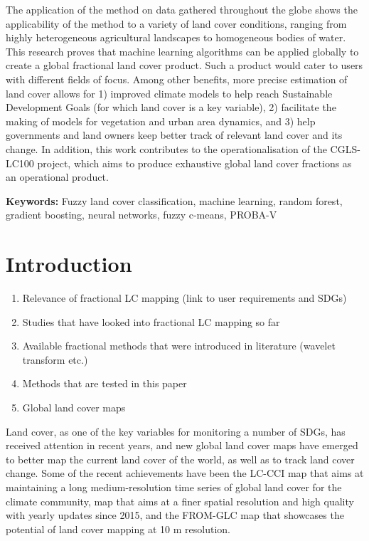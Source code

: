 \documentclass[a4paper,10pt]{article}
\newcommand{\minisection}[1]{\medskip \textbf{#1:}}
\begin{document}
{The application of the method on data gathered throughout the globe shows the applicability of the method to a variety of land cover conditions, ranging from highly heterogeneous agricultural landscapes to homogeneous bodies of water. This research proves that machine learning algorithms can be applied globally to create a global fractional land cover product. Such a product would cater to users with different fields of focus. Among other benefits, more precise estimation of land cover allows for 1) improved climate models to help reach Sustainable Development Goals (for which land cover is a key variable), 2) facilitate the making of models for vegetation and urban area dynamics, and 3) help governments and land owners keep better track of relevant land cover and its change. In addition, this work contributes to the operationalisation of the CGLS-LC100 project, which aims to produce exhaustive global land cover fractions as an operational product.

\minisection{Keywords} Fuzzy land cover classification, machine learning, random forest, gradient boosting, neural networks, fuzzy c-means, PROBA-V
}

\pagebreak
\tableofcontents
\pagebreak

\section{Introduction}

\begin{enumerate}
 \item Relevance of fractional LC mapping (link to user requirements and SDGs)
 \item Studies that have looked into fractional LC mapping so far
 \item Available fractional methods that were introduced in literature (wavelet transform etc.)
 \item Methods that are tested in this paper
 \item Global land cover maps
\end{enumerate}

Land cover, as one of the key variables for monitoring a number of \glspl{SDG}, has received attention in recent years, and new global land cover maps have emerged to better map the current land cover of the world, as well as to track land cover change.
Some of the recent achievements have been the \ac{LC-CCI} map  that aims at maintaining a long medium-resolution time series of global land cover for the climate community,  map that aims at a finer spatial resolution and high quality with yearly updates since 2015, and the \ac{FROM-GLC} map \citep{fromglc2019} that showcases the potential of land cover mapping at 10 m resolution.
\end{document}
